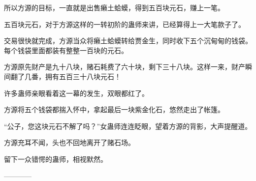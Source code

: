 \begin{this_body}
所以方源的目标，一直就是出售癞土蛤蟆，得到五百块元石，赚上一笔。

五百块元石，对于方源这样的一转初阶的蛊师来讲，已经算得上一大笔款子了。

交易很快就完成，方源当众将癞土蛤蟆转给贾金生，同时收下五个沉甸甸的钱袋。每个钱袋里面都装有整整一百块的元石。

方源原先财产是九十八块，赌石耗费了六十块，剩下三十八块。这样一来，财产瞬间翻了几番，拥有五百三十八块元石！

许多蛊师亲眼看着这一幕的发生，双眼都红了。

方源将五个钱袋都揣入怀中，拿起最后一块紫金化石，悠然走出了帐篷。

“公子，您这块元石不解了吗？”女蛊师连连眨眼，望着方源的背影，大声提醒道。

方源充耳不闻，头也不回地离开了赌石场。

留下一众错愕的蛊师，相视默然。

------------

\end{this_body}

